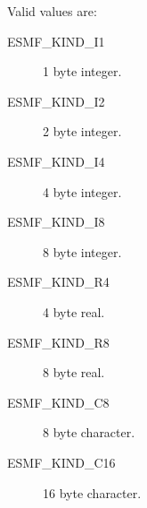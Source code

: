 Valid values are:
\begin{description}
\item [ESMF\_KIND\_I1]
      1 byte integer.
\item [ESMF\_KIND\_I2]
      2 byte integer.
\item [ESMF\_KIND\_I4]
      4 byte integer.
\item [ESMF\_KIND\_I8]
      8 byte integer.
\item [ESMF\_KIND\_R4]
      4 byte real.
\item [ESMF\_KIND\_R8]
      8 byte real.
\item [ESMF\_KIND\_C8]
      8 byte character.
\item [ESMF\_KIND\_C16]
      16 byte character.
\end{description}









